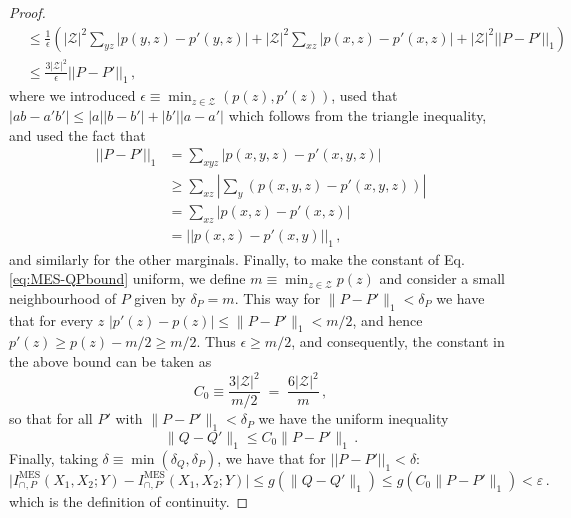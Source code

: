 \documentclass{article}
\begin{document}
\begin{proof}
\begin{equation}
\begin{aligned}
        & \leq \frac1\epsilon \left(|\mathcal{Z}|^2 \sum_{yz}|p(y,z)-p'(y,z)|+|\mathcal{Z}|^2 \sum_{xz}|p(x,z)-p'(x,z)|+|\mathcal{Z}|^2 ||P-P'||_1 \right)\\
        & \leq \frac{3|\mathcal{Z}|^2}{\epsilon}||P-P'||_1\,,
    \end{aligned}
    \end{equation}
    where we introduced $\epsilon\equiv \min_{z\in\mathcal{Z}}(p(z), p'(z))$, used that $|ab-a'b'|\leq |a||b-b'|+|b'||a-a'|$ which follows from the triangle inequality, and used the fact that 
    \begin{equation}
        \begin{aligned}
            ||P-P'||_1 & = \sum_{xyz} |p(x,y,z)-p'(x,y,z)| \\
            & \ge \sum_{xz} \left|\sum_y(p(x,y,z)-p'(x,y,z)) \right| \\
            & = \sum_{xz} \left|p(x,z)-p'(x,z) \right| \\
            & = ||p(x,z)-p'(x,y)||_1 \,,
        \end{aligned}
    \end{equation}
    and similarly for the other marginals.
    Finally, to make the constant of Eq.\eqref{eq:MES-QPbound} uniform, we define $m\equiv\min_{z\in\mathcal Z} p(z)$ and consider a small neighbourhood of $P$ given by $\delta_P=m$. This way for $\|P-P'\|_1 < \delta_P$ we have that for every $z$
    $|p'(z)-p(z)| \le \|P-P'\|_1 < m/2$, and hence $p'(z)\ge p(z)-m/2 \ge m/2$. 
    Thus $\epsilon \ge m/2$, and consequently, the constant in the above bound can be taken as
    \begin{equation}
      C_0 \equiv \frac{3|\mathcal Z|^2}{m/2} \;=\; \frac{6|\mathcal Z|^2}{m}\,,
    \end{equation}
    so that for all $P'$ with $\|P-P'\|_1<\delta_P$ we have the uniform inequality
    \begin{equation}
      \|Q-Q'\|_1 \le C_0 \|P-P'\|_1\,.
    \end{equation}
    Finally, taking $\delta\equiv\min(\delta_Q,\delta_P)$, we have that for $||P-P'||_1<\delta$:
    \begin{equation}
        \big|I^\text{MES}_{\cap,P}(X_1,X_2;Y)-I^\text{MES}_{\cap,P'}(X_1,X_2;Y)\big|\le g(\|Q-Q'\|_1)
      \le g(C_0\|P-P'\|_1) < \varepsilon\,.
    \end{equation}
    which is the definition of continuity.
\end{proof}
\end{document}
